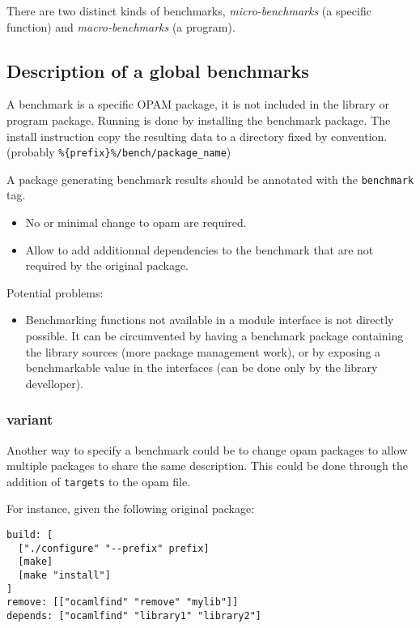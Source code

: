 \documentclass[11pt,a4paper]{article}
\begin{document}
There are two distinct kinds of benchmarks, \emph{micro-benchmarks} (a specific
function) and \emph{macro-benchmarks} (a program).

\subsection{Description of a global benchmarks}

A benchmark is a specific OPAM package, it is not included in the
library or program package. Running is done by installing the
benchmark package. The install instruction copy the resulting data to
a directory fixed by convention. (probably
\texttt{\%\{prefix\}\%/bench/package\_name})

A package generating benchmark results should be annotated with the
\texttt{benchmark} tag.

\begin{itemize}
\item No or minimal change to opam are required.
\item Allow to add additionnal dependencies to the benchmark that are
  not required by the original package.
\end{itemize}

Potential problems:
\begin{itemize}
\item Benchmarking functions not available in a module interface is
  not directly possible. It can be circumvented by having a benchmark
  package containing the library sources (more package management
  work), or by exposing a benchmarkable value in the interfaces (can
  be done only by the library develloper).
\end{itemize}

\subsubsection{variant}

Another way to specify a benchmark could be to change opam packages to
allow multiple packages to share the same description. This could be
done through the addition of {\tt targets} to the opam file.

For instance, given the following original package:

\begin{verbatim}
build: [
  ["./configure" "--prefix" prefix]
  [make]
  [make "install"]
]
remove: [["ocamlfind" "remove" "mylib"]]
depends: ["ocamlfind" "library1" "library2"]
\end{verbatim}
\end{document}
